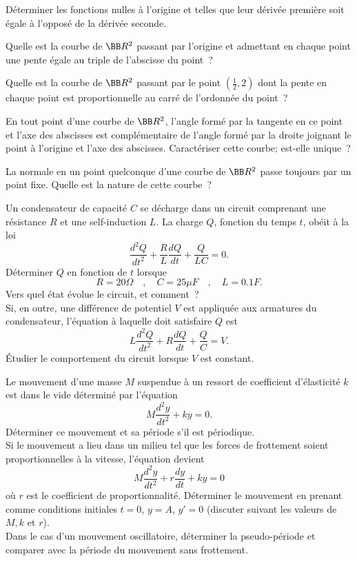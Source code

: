 \documentclass[12pt,french,oneside,a4paper]{memoir} %
\begin{document}
\begin{exo}
Déterminer les fonctions nulles à l'origine et telles que
leur dérivée première soit égale à l'opposé de la
dérivée seconde.
\end{exo}
\begin{exo}
Quelle est la courbe de $\BB R^2$ passant par l'origine et
admettant en chaque point une pente égale au triple de l'abscisse
du point~?
\end{exo}
\begin{exo}
Quelle est la courbe de $\BB R^2$ passant par le point
$\displaystyle{(\frac{1}{2},2)}$ dont la pente en chaque point est
proportionnelle au carré de l'ordonnée du point~?
\end{exo}
\begin{exo}
En tout point d'une courbe de $\BB R^2$, l'angle formé par la
tangente en ce point et l'axe des abscisses est complémentaire de
l'angle formé par la droite joignant le point à l'origine et
l'axe des abscisses. Caractériser cette courbe; est-elle unique~?
\end{exo}
\begin{exo}
La normale en un point quelconque d'une courbe de $\BB R^2$
passe toujours par un point fixe. Quelle est la nature de cette
courbe~?
\end{exo}
\begin{exo}
Un condensateur de capacité $C$ se décharge dans un circuit
comprenant une résistance $R$ et une self-induction $L$. La
charge $Q$, fonction du temps $t$, obéit à la loi
$$
\displaystyle{\frac{d^2Q}{dt^2}+\frac{R}{L}\frac{dQ}{dt}
+\frac{Q}{LC}=0.}
$$
Déterminer $Q$ en fonction de $t$ lorsque
$$
R=20\Omega\quad,\quad C=25\mu F\quad,\quad L=0{.}1F.
$$
Vers quel état évolue le circuit, et comment~?\\
Si, en outre, une différence de potentiel $V$ est appliquée aux
armatures du condensateur, l'équation à laquelle doit
satisfaire $Q$ est
$$
\displaystyle{L\frac{d^2Q}{dt^2}+R\frac{dQ}{dt}+\frac{Q}{C}=V}.
$$
Étudier le comportement du circuit lorsque $V$ est constant.
\end{exo}
\begin{exo}
Le mouvement d'une masse $M$ suspendue à un ressort de
coefficient d'élasticité $k$ est dans le vide déterminé par
l'équation
$$
\displaystyle{M\frac{d^2y}{dt^2}+ky=0}.$$
Déterminer ce mouvement et sa période s'il est périodique.\\
Si le mouvement a lieu dans un milieu tel que les forces de
frottement soient proportionnelles à la vitesse, l'équation
devient
$$
\displaystyle{M\frac{d^2y}{dt^2}+r\frac{dy}{dt}+ky=0}
$$
où $r$ est le coefficient de proportionnalité. Déterminer le
mouvement en prenant comme conditions initiales $t=0$, $y=A$,
$y'=0$ (discuter suivant les valeurs de $M, k$ et $r$).\\
Dans le cas d'un mouvement oscillatoire, déterminer la pseudo-période
et comparer avec la période du mouvement sans frottement.
\end{exo}
\end{document}
